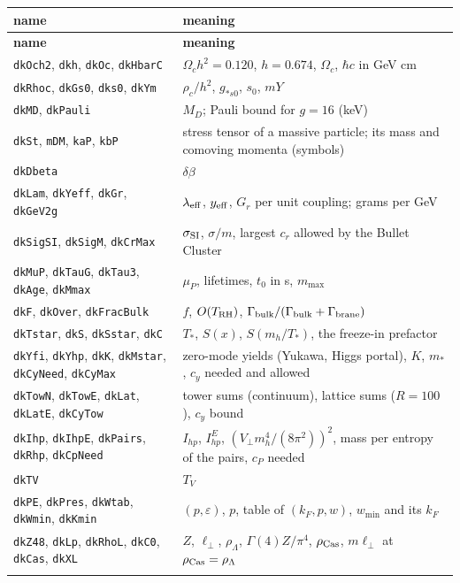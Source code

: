 \documentclass[10pt,a4paper]{article}
\begin{document}
{\footnotesize
\begin{longtable}{>{\raggedright\arraybackslash}p{}>{\raggedright\arraybackslash}p{}}
\toprule
\textbf{name} & \textbf{meaning} \\
\midrule\endfirsthead
\toprule
\textbf{name} & \textbf{meaning} \\
\midrule\endhead
\endfoot
\bottomrule\endlastfoot
\texttt{dkOch2}, \texttt{dkh}, \texttt{dkOc}, \texttt{dkHbarC} & $\Omega_ch^2=0.120$, $h=0.674$, $\Omega_c$, $\hbar c$ in GeV cm \\
\texttt{dkRhoc}, \texttt{dkGs0}, \texttt{dks0}, \texttt{dkYm} & $\rho_c/h^2$, $g_{*s0}$, $s_0$, $mY$ \\
\texttt{dkMD}, \texttt{dkPauli} & $M_D$; Pauli bound for $g=16$ (keV) \\
\texttt{dkSt}, \texttt{mDM}, \texttt{kaP}, \texttt{kbP} & stress tensor of a massive particle; its mass and comoving momenta (symbols) \\
\texttt{dkDbeta} & $\delta\beta$ \\
\texttt{dkLam}, \texttt{dkYeff}, \texttt{dkGr}, \texttt{dkGeV2g} & $\lambda_{\rm eff}$, $y_{\rm eff}$, $G_r$ per unit coupling; grams per GeV \\
\texttt{dkSigSI}, \texttt{dkSigM}, \texttt{dkCrMax} & $\sigma_{\rm SI}$, $\sigma/m$, largest $c_r$ allowed by the Bullet Cluster \\
\texttt{dkMuP}, \texttt{dkTauG}, \texttt{dkTau3}, \texttt{dkAge}, \texttt{dkMmax} & $\mu_P$, lifetimes, $t_0$ in s, $m_{\max}$ \\
\texttt{dkF}, \texttt{dkOver}, \texttt{dkFracBulk} & $f$, $O(T_{\rm RH})$, $\Gamma_{\rm bulk}/(\Gamma_{\rm bulk}+\Gamma_{\rm brane})$ \\
\texttt{dkTstar}, \texttt{dkS}, \texttt{dkSstar}, \texttt{dkC} & $T_*$, $S(x)$, $S(m_h/T_*)$, the freeze-in prefactor \\
\texttt{dkYfi}, \texttt{dkYhp}, \texttt{dkK}, \texttt{dkMstar}, \texttt{dkCyNeed}, \texttt{dkCyMax} & zero-mode yields (Yukawa, Higgs portal), $K$, $m_*$, $c_y$ needed and allowed \\
\texttt{dkTowN}, \texttt{dkTowE}, \texttt{dkLat}, \texttt{dkLatE}, \texttt{dkCyTow} & tower sums (continuum), lattice sums ($R=100$), $c_y$ bound \\
\texttt{dkIhp}, \texttt{dkIhpE}, \texttt{dkPairs}, \texttt{dkRhp}, \texttt{dkCpNeed} & $I_{hp}$, $I^E_{hp}$, $(V_\perp m_h^4/(8\pi^2))^2$, mass per entropy of the pairs, $c_P$ needed \\
\texttt{dkTV} & $T_V$ \\
\texttt{dkPE}, \texttt{dkPres}, \texttt{dkWtab}, \texttt{dkWmin}, \texttt{dkKmin} & $(p,\varepsilon)$, $p$, table of $(k_F,p,w)$, $w_{\min}$ and its $k_F$ \\
\texttt{dkZ48}, \texttt{dkLp}, \texttt{dkRhoL}, \texttt{dkC0}, \texttt{dkCas}, \texttt{dkXL} & $Z$, $\ell_\perp$, $\rho_\Lambda$, $\Gamma(4)Z/\pi^4$, $\rho_{\rm Cas}$, $m\ell_\perp$ at $\rho_{\rm Cas}=\rho_\Lambda$ \\*
\end{longtable}}
\end{document}

